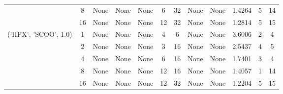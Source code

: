 \begin{tabular}{cccccccccccc}
& 8& None& None& None& 6& 32& None& None& 1.4264& 5& 14\\
& 16& None& None& None& 12& 32& None& None& 1.2814& 5& 15\\
\hline
\multirow{5}{*}{('HPX', 'SCOO', 1.0)}& 1& None& None& None& 4& 6& None& None& 3.6006& 2& 4\\
& 2& None& None& None& 3& 16& None& None& 2.5437& 4& 5\\
& 4& None& None& None& 6& 16& None& None& 1.7401& 3& 4\\
& 8& None& None& None& 12& 16& None& None& 1.4057& 1& 14\\
& 16& None& None& None& 12& 32& None& None& 1.2204& 5& 15\\
\hline
\end{tabular}
